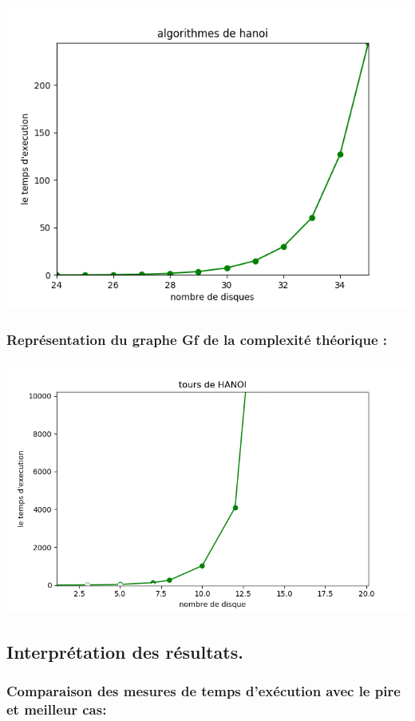 \documentclass[12pt]{article}
\begin{document}
\includegraphics[width=1\textwidth]{graphe/hanoi.png}

\subsubsection{Représentation du graphe Gf de la complexité théorique :}

\includegraphics[width=1\textwidth]{graphe/THhanoi.png}


\subsection{Interprétation des résultats.}
\subsubsection{Comparaison des mesures de temps d'exécution avec le pire et meilleur cas:}
	  
\end{document}
